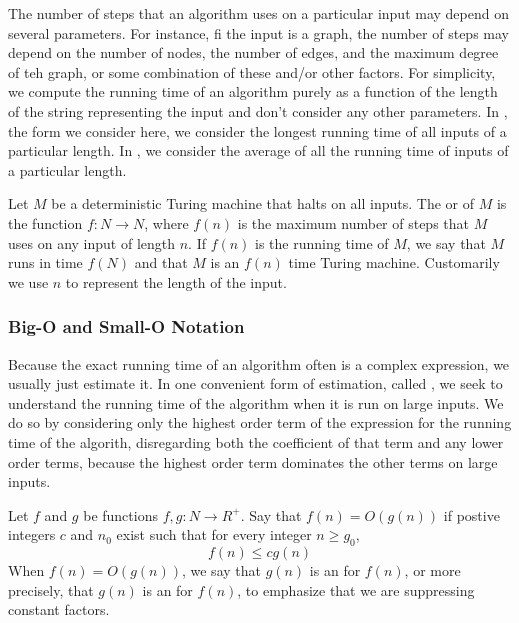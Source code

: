 \documentclass{article}
\begin{document}
The number of steps that an algorithm uses on a particular input may depend on several parameters. For instance, fi the input is a graph, the number of steps may depend on the number of nodes, the number of edges, and the maximum degree of teh graph, or some combination of these and/or other factors. For simplicity, we compute the running time of an algorithm purely as a function of the length of the string representing the input and don't consider any other parameters. In , the form we consider here, we consider the longest running time of all inputs of a particular length. In , we consider the average of all the running time of inputs of a particular length. 

\begin{definition}
  Let $M$ be a deterministic Turing machine that halts on all inputs. The  or  of $M$ is the function $f: N \rightarrow N$, where $f(n)$ is the maximum number of steps that $M$ uses on any input of length $n$. If $f(n)$ is the running time of $M$, we say that $M$ runs in time $f(N)$ and that $M$ is an $f(n)$ time Turing machine. Customarily we use $n$ to represent the length of the input. 
\end{definition}

\subsubsection{Big-O and Small-O Notation}

Because the exact running time of an algorithm often is a complex expression, we usually just estimate it. In one convenient form of estimation, called , we seek to understand the running time of the algorithm when it is run on large inputs. We do so by considering only the highest order term of the expression for the running time of the algorith, disregarding both the coefficient of that term and any lower order terms, because the highest order term dominates the other terms on large inputs. 

\begin{definition}
  Let $f$ and $g$ be functions $f,g: N \rightarrow R^{+}$. Say that $f(n) = O(g(n))$ if postive integers $c$ and $n_0$ exist such that for every integer $n \geq g_0$, $$f(n) \leq c g(n)$$ When $f(n) = O(g(n))$, we say that $g(n)$ is an  for $f(n)$, or more precisely, that $g(n)$ is an  for $f(n)$, to emphasize that we are suppressing constant factors. 
\end{definition}
\end{document}

